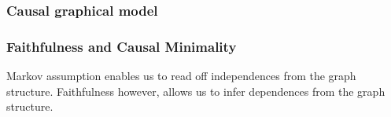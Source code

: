 \documentclass{beamer}
\begin{document}

\begin{frame}
    \frametitle{Causal graphical model} 
\end{frame}

\begin{frame}
    \frametitle{Faithfulness and Causal Minimality}
    \begin{flushleft}
        Markov assumption enables us to read off independences from the graph structure. Faithfulness however, allows us to infer
        dependences from the graph structure. 
    \end{flushleft}
\end{frame}

\end{document}
